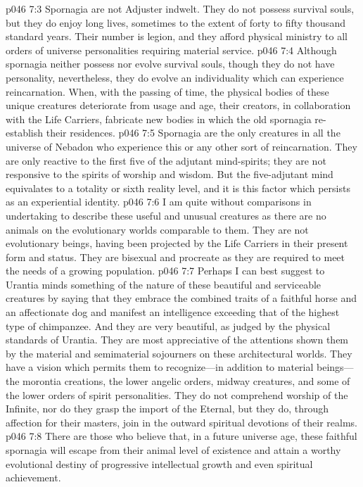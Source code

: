\vs p046 7:3 Spornagia are not Adjuster indwelt. They do not possess survival souls, but they do enjoy long lives, sometimes to the extent of forty to fifty thousand standard years. Their number is legion, and they afford physical ministry to all orders of universe personalities requiring material service.
\pc \vs p046 7:4 Although spornagia neither possess nor evolve survival souls, though they do not have personality, nevertheless, they do evolve an individuality which can experience reincarnation. When, with the passing of time, the physical bodies of these unique creatures deteriorate from usage and age, their creators, in collaboration with the Life Carriers, fabricate new bodies in which the old spornagia re\hyp{}establish their residences.
\vs p046 7:5 Spornagia are the only creatures in all the universe of Nebadon who experience this or any other sort of reincarnation. They are only reactive to the first five of the adjutant mind\hyp{}spirits; they are not responsive to the spirits of worship and wisdom. But the five\hyp{}adjutant mind equivalates to a totality or sixth reality level, and it is this factor which persists as an experiential identity.
\pc \vs p046 7:6 I am quite without comparisons in undertaking to describe these useful and unusual creatures as there are no animals on the evolutionary worlds comparable to them. They are not evolutionary beings, having been projected by the Life Carriers in their present form and status. They are bisexual and procreate as they are required to meet the needs of a growing population.
\vs p046 7:7 Perhaps I can best suggest to Urantia minds something of the nature of these beautiful and serviceable creatures by saying that they embrace the combined traits of a faithful horse and an affectionate dog and manifest an intelligence exceeding that of the highest type of chimpanzee. And they are very beautiful, as judged by the physical standards of Urantia. They are most appreciative of the attentions shown them by the material and semimaterial sojourners on these architectural worlds. They have a vision which permits them to recognize---in addition to material beings---the morontia creations, the lower angelic orders, midway creatures, and some of the lower orders of spirit personalities. They do not comprehend worship of the Infinite, nor do they grasp the import of the Eternal, but they do, through affection for their masters, join in the outward spiritual devotions of their realms.\plusone
\pc \vs p046 7:8 There are those who believe that, in a future universe age, these faithful spornagia will escape from their animal level of existence and attain a worthy evolutional destiny of progressive intellectual growth and even spiritual achievement.
